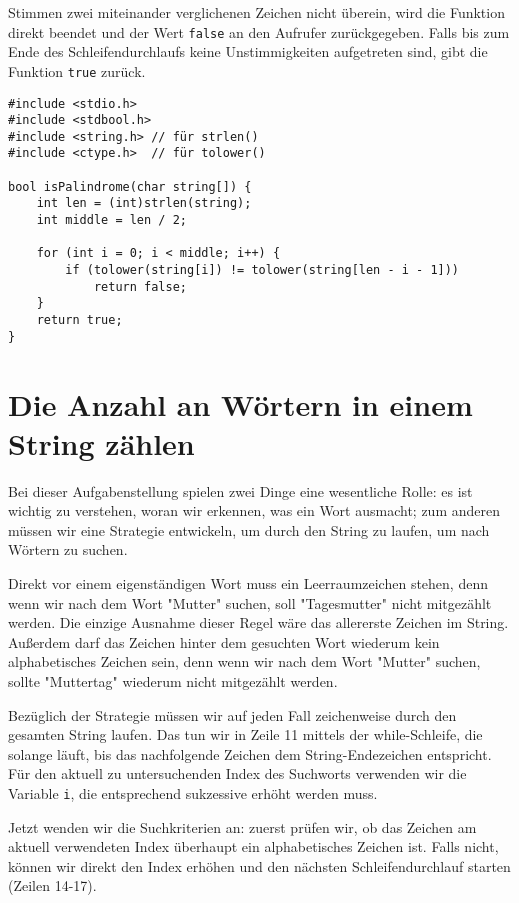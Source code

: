 Stimmen zwei miteinander verglichenen Zeichen nicht überein, wird die Funktion
direkt beendet und der Wert \texttt{false} an den Aufrufer zurückgegeben.
Falls bis zum Ende des Schleifendurchlaufs keine Unstimmigkeiten aufgetreten
sind, gibt die Funktion \texttt{true} zurück.

\begin{verbatim}
#include <stdio.h>
#include <stdbool.h>
#include <string.h> // für strlen()
#include <ctype.h>  // für tolower()

bool isPalindrome(char string[]) {
    int len = (int)strlen(string);
    int middle = len / 2;

    for (int i = 0; i < middle; i++) {
        if (tolower(string[i]) != tolower(string[len - i - 1]))
            return false;
    }
    return true;
}
\end{verbatim}





\chapter{Die Anzahl an Wörtern in einem String zählen}

Bei dieser Aufgabenstellung spielen zwei Dinge eine wesentliche Rolle: es ist
wichtig zu verstehen, woran wir erkennen, was ein Wort ausmacht; zum anderen
müssen wir eine Strategie entwickeln, um durch den String zu laufen, um nach
Wörtern zu suchen.

Direkt vor einem eigenständigen Wort muss ein Leerraumzeichen stehen, denn wenn
wir nach dem Wort "Mutter" suchen, soll "Tagesmutter" nicht mitgezählt werden.
Die einzige Ausnahme dieser Regel wäre das allererste Zeichen im String.
Außerdem darf das Zeichen hinter dem gesuchten Wort wiederum kein alphabetisches
Zeichen sein, denn wenn wir nach dem Wort "Mutter" suchen, sollte "Muttertag"
wiederum nicht mitgezählt werden.

Bezüglich der Strategie müssen wir auf jeden Fall zeichenweise durch den
gesamten String laufen. Das tun wir in Zeile 11 mittels der while-Schleife, die
solange läuft, bis das nachfolgende Zeichen dem String-Endezeichen entspricht.
Für den aktuell zu untersuchenden Index des Suchworts verwenden wir die Variable
\texttt{i}, die entsprechend sukzessive erhöht werden muss.

Jetzt wenden wir die Suchkriterien an: zuerst prüfen wir, ob das Zeichen am
aktuell verwendeten Index überhaupt ein alphabetisches Zeichen ist. Falls nicht,
können wir direkt den Index erhöhen und den nächsten Schleifendurchlauf starten
(Zeilen 14-17).


